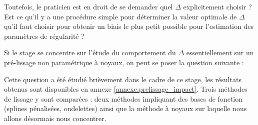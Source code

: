 \smallskip

Toutefois, le praticien est en droit de se demander quel $\Delta$ explicitement choisir ? Est ce qu'il y a une procédure simple pour déterminer la valeur optimale de $\Delta$ qu'il faut choisir pour obtenir un biais le plus petit possible pour l'estimation des paramètres de régularité ?

Si le stage se concentre sur l'étude du comportement du $\Delta$ essentiellement sur un pré-lissage non paramétrique à noyaux, on peut se poser la question suivante :


Cette question a été étudié brièvement dans le cadre de ce stage, les résultats obtenus sont disponibles en annexe \ref{annexe:prelissage_impact}. Trois méthodes de lissage y sont comparées : deux méthodes impliquant des bases de fonction (splines pénalisées, ondelettes) ainsi que la méthode à noyaux sur laquelle nous allons désormais nous concentrer.